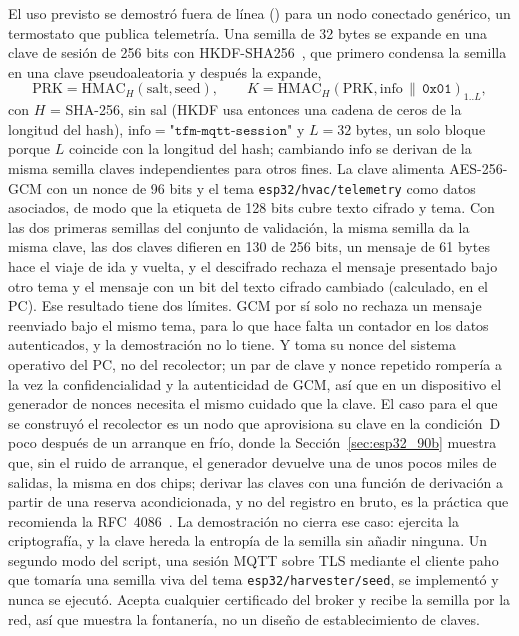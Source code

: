 El uso previsto se demostró fuera de línea
() para un nodo conectado
genérico, un termostato que publica telemetría. Una semilla de 32 bytes
se expande en una clave de sesión de 256 bits con
HKDF-SHA256~\cite{krawczyk_2010_hkdf}, que primero condensa la semilla en
una clave pseudoaleatoria y después la expande,
\begin{equation}
\mathrm{PRK} = \mathrm{HMAC}_H(\mathrm{salt}, \mathrm{seed}), \qquad
K = \mathrm{HMAC}_H(\mathrm{PRK}, \mathrm{info} \,\|\, \texttt{0x01})_{1..L},
\label{eq:esp32_hkdf}
\end{equation}
con $H$ = SHA-256, sin sal (HKDF usa entonces una cadena de ceros de la
longitud del hash), $\mathrm{info} = \texttt{"tfm-mqtt-session"}$ y
$L = 32$ bytes, un solo bloque porque $L$ coincide con la longitud del
hash; cambiando $\mathrm{info}$ se derivan de la misma semilla claves
independientes para otros fines. La clave alimenta AES-256-GCM con un
nonce de 96 bits y el tema \texttt{esp32/hvac/telemetry} como datos
asociados, de modo que la etiqueta de 128 bits cubre texto cifrado y
tema. Con las dos primeras semillas del conjunto de validación, la misma
semilla da la misma clave, las dos claves difieren en 130 de 256 bits,
un mensaje de 61 bytes hace el viaje de ida y vuelta, y el descifrado
rechaza el mensaje presentado bajo otro tema y el mensaje con un bit del
texto cifrado cambiado (calculado, en el PC). Ese resultado tiene dos
límites. GCM por sí solo no rechaza un mensaje reenviado bajo el mismo
tema, para lo que hace falta un contador en los datos autenticados, y la
demostración no lo tiene. Y toma su nonce del sistema operativo del PC,
no del recolector; un par de clave y nonce repetido rompería a la vez la
confidencialidad y la autenticidad de GCM, así que en un dispositivo el
generador de nonces necesita el mismo cuidado que la clave. El caso para
el que se construyó el recolector es un nodo que aprovisiona su clave en
la condición~D poco después de un arranque en frío, donde la
Sección~\ref{sec:esp32_90b} muestra que, sin el ruido de arranque, el
generador devuelve una de unos pocos miles de salidas, la misma en dos
chips; derivar las claves con una función de derivación a partir de una
reserva acondicionada, y no del registro en bruto, es la práctica que
recomienda la RFC~4086~\cite{eastlake_2005_rfc4086}. La demostración no
cierra ese caso: ejercita la criptografía, y la clave hereda la entropía
de la semilla sin añadir ninguna. Un segundo modo del script, una sesión
MQTT sobre TLS mediante el cliente paho que tomaría una semilla viva del
tema \texttt{esp32/harvester/seed}, se implementó y nunca se ejecutó.
Acepta cualquier certificado del broker y recibe la semilla por la red,
así que muestra la fontanería, no un diseño de establecimiento de claves.

